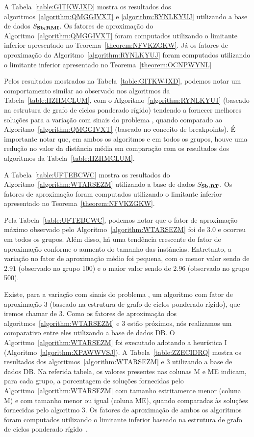 A Tabela~\ref{table:GITKWJXD} mostra os resultados dos algoritmos~\ref{algorithm:QMGGIVXT} e \ref{algorithm:RYNLKYUJ} utilizando a base de dados $S_{\textbf{Sb\textsubscript{I}RMI}}{}$. Os fatores de aproximação do Algoritmo~\ref{algorithm:QMGGIVXT} foram computados utilizando o limitante inferior apresentado no Teorema~\ref{theorem:NFVKZGKW}. Já os fatores de aproximação do Algoritmo~\ref{algorithm:RYNLKYUJ} foram computados utilizando o limitante inferior apresentado no Teorema~\ref{theorem:OCNPWYNL}



Pelos resultados mostrados na Tabela~\ref{table:GITKWJXD}, podemos notar um comportamento similar ao observado nos algoritmos da Tabela~\ref{table:HZHMCLUM}, com o Algoritmo~\ref{algorithm:RYNLKYUJ} (baseado na estrutura de grafo de ciclos ponderado rígido) tendendo a fornecer melhores soluções para a variação com sinais do problema \SbIRMI{}, quando comparado ao Algoritmo~\ref{algorithm:QMGGIVXT} (baseado no conceito de breakpoints). É importante notar que, em ambos os algoritmos e em todos os grupos, houve uma redução no valor da distância média em comparação com os resultados dos algoritmos da Tabela~\ref{table:HZHMCLUM}.

A Tabela~\ref{table:UFTEBCWC} mostra os resultados do Algoritmo~\ref{algorithm:WTARSEZM} utilizando a base de dados $S_{\textbf{Sb\textsubscript{I}RT}}{}$. Os fatores de aproximação foram computados utilizando o limitante inferior apresentado no Teorema~\ref{theorem:NFVKZGKW}.



Pela Tabela~\ref{table:UFTEBCWC}, podemos notar que o fator de aproximação máximo observado pelo Algoritmo~\ref{algorithm:WTARSEZM} foi de $3.0$ e ocorreu em todos os grupos. Além disso, há uma tendência crescente do fator de aproximação conforme o aumento do tamanho das instâncias. Entretanto, a variação no fator de aproximação médio foi pequena, com o menor valor sendo de $2.91$ (observado no grupo 100) e o maior valor sendo de $2.96$ (observado no grupo 500).

Existe, para a variação com sinais do problema \SbIRT{}, um algoritmo com fator de aproximação $3$ (baseado na estrutura de grafo de ciclos ponderado rígido), que iremos chamar de $3$\SbIRT{}. Como os fatores de aproximação dos algoritmos~\ref{algorithm:WTARSEZM} e $3$\SbIRT{} estão próximos, nós realizamos um comparativo entre eles utilizando a base de dados DB\textsubscript{\SbIRT}. O Algoritmo~\ref{algorithm:WTARSEZM} foi executado adotando a heurística I (Algoritmo~\ref{algorithm:XPAWWVSJ}). A Tabela~\ref{table:ZZECIDRQ} mostra os resultados dos algoritmos~\ref{algorithm:WTARSEZM} e $3$\SbIRT{} utilizando a base de dados DB\textsubscript{\SbIRT}. Na referida tabela, os valores presentes nas colunas M e ME indicam, para cada grupo, a porcentagem de soluções fornecidas pelo Algoritmo~\ref{algorithm:WTARSEZM} com tamanho estritamente menor (coluna M) e com tamanho menor ou igual (coluna ME), quando comparadas às soluções fornecidas pelo algoritmo $3$\SbIRT{}. Os fatores de aproximação de ambos os algoritmos foram computados utilizando o limitante inferior baseado na estrutura de grafo de ciclos ponderado rígido~\cite[Teorema 3.8]{2021a-oliveira-etal}. 

